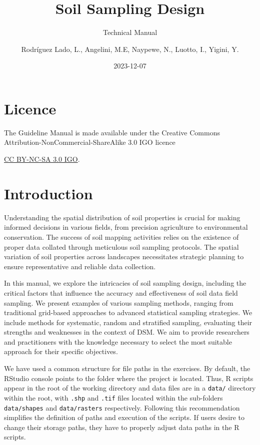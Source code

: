 \documentclass[
]{book}
\title{Soil Sampling Design}
\subtitle{Technical Manual}
\author{Rodríguez Lado, L., Angelini, M.E, Naypewe, N., Luotto, I., Yigini, Y.}
\date{2023-12-07}
\begin{document}
\maketitle

{
\setcounter{tocdepth}{1}
\tableofcontents
}
\hypertarget{licence}{%
\chapter*{Licence}\label{licence}}

The Guideline Manual is made available under the Creative Commons Attribution-NonCommercial-ShareAlike 3.0 IGO licence

\href{https://creativecommons.org/licenses/by-nc-sa/3.0/igo/legalcode}{CC BY-NC-SA 3.0 IGO}.

\hypertarget{introduction}{%
\chapter{Introduction}\label{introduction}}

Understanding the spatial distribution of soil properties is crucial for making informed decisions in various fields, from precision agriculture to environmental conservation. The success of soil mapping activities relies on the existence of proper data collated through meticulous soil sampling protocols. The spatial variation of soil properties across landscapes necessitates strategic planning to ensure representative and reliable data collection.

In this manual, we explore the intricacies of soil sampling design, including the critical factors that influence the accuracy and effectiveness of soil data field sampling. We present examples of various sampling methods, ranging from traditional grid-based approaches to advanced statistical sampling strategies. We include methods for systematic, random and stratified sampling, evaluating their strengths and weaknesses in the context of DSM. We aim to provide researchers and practitioners with the knowledge necessary to select the most suitable approach for their specific objectives.

We have used a common structure for file paths in the exercises. By default, the RStudio console points to the folder where the project is located. Thus, R scripts appear in the root of the working directory and data files are in a \texttt{\textquotesingle{}data/\textquotesingle{}} directory within the root, with \texttt{\textquotesingle{}.shp\textquotesingle{}} and \texttt{\textquotesingle{}.tif\textquotesingle{}} files located within the sub-folders \texttt{\textquotesingle{}data/shapes\textquotesingle{}} and \texttt{\textquotesingle{}data/rasters\textquotesingle{}} respectively. Following this recommendation simplifies the definition of paths and execution of the scripts. If users desire to change their storage paths, they have to properly adjust data paths in the R scripts.
\end{document}
